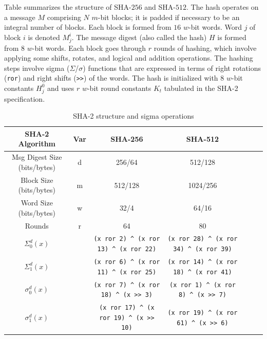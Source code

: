 \documentclass{article}
\begin{document}
Table summarizes the structure of SHA-$256$ and SHA-$512$. The hash
operates on a message $M$ comprising $N$ $m$-bit blocks; it is padded if
necessary to be an integral number of blocks. Each block is formed
from $16$ $w$-bit words. Word $j$ of block $i$ is denoted $M_j^{i}$.
The message digest (also called the hash) $H$ is formed from $8$ $w$-bit
words. Each block goes through $r$ rounds of hashing, which involve
applying some shifts, rotates, and logical and addition
operations. The hashing steps involve sigma ($\Sigma$/$\sigma$) functions that are
expressed in terms of right rotations (\verb!ror!) and right shifts (\verb!>>!) of
the words. The hash is initialized with $8$ $w$-bit constants $H_j^{0}$
and uses $r$ $w$-bit round constants $K_t$ tabulated in the SHA-2
specification.
\begin{table}
  \centering
  {\footnotesize
  \begin{tabular}{|c|c|c|c|c|c|c|} \hline
    SHA-2 Algorithm & Var & SHA-256 & SHA-512 \\ \hline \hline
    Msg Digest Size (bits/bytes) & d & 256/64 & 512/128 \\ \hline
    Block Size (bits/bytes) & m & 512/128 & 1024/256 \\ \hline
    Word Size (bits/bytes) & w & 32/4 & 64/16 \\ \hline
    Rounds & r & 64 & 80 \\ \hline
    $\Sigma_0^{d} (x)$ & &
    \verb!(x ror 2) ^ (x ror 13) ^ (x ror 22)! &
    \verb!(x ror 28) ^ (x ror 34) ^ (x ror 39)! \\ \hline
    $\Sigma_1^{d} (x)$ & &
    \verb!(x ror 6) ^ (x ror 11) ^ (x ror 25)! &
    \verb!(x ror 14) ^ (x ror 18) ^ (x ror 41)! \\ \hline
    $\sigma_0^{d} (x)$ & &
    \verb!(x ror 7) ^ (x ror 18) ^ (x >> 3)! &
    \verb!(x ror 1) ^ (x ror 8) ^ (x >> 7)! \\ \hline
    $\sigma_1^{d} (x)$ & &
    \verb!(x ror 17) ^ (x ror 19) ^ (x >> 10)! &
    \verb!(x ror 19) ^ (x ror 61) ^ (x >> 6)! \\ \hline
  \end{tabular}
  }
  \caption{SHA-2 structure and sigma operations}
\end{table}
\end{document}
